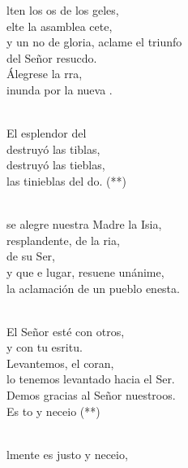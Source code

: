 \begin{cancion}%
	lten los os de los geles,\\
	elte la asamblea cete,\\
	y un no de gloria, aclame el triunfo\\
	del Señor resucdo.\\
	Álegrese la rra,\\
	inunda por la nueva .\\\jump\\
	\begin{chorus}%
	El esplendor del \\
	destruyó las tiblas,\\
	destruyó las tieblas,\\
	las tinieblas del do. (**)\\
	\end{chorus}%
	\jump\\
	 se alegre nuestra Madre la Isia,\\
	resplandente, de la ria,\\
	de su Ser,\\
	y que e lugar, resuene unánime,\\
	la aclamación de un pueblo enesta.\\\jump\\
	\begin{chorus}%
	El Señor esté con otros,\\
	y con tu esritu.\\
	Levantemos, el coran,\\
	lo tenemos levantado hacia el Ser.\\
	Demos gracias al Señor nuestroos.\\
	Es to y neceio (**)\\
	\end{chorus}%
	\jump\\
	lmente es justo y neceio,\\

\end{cancion}
